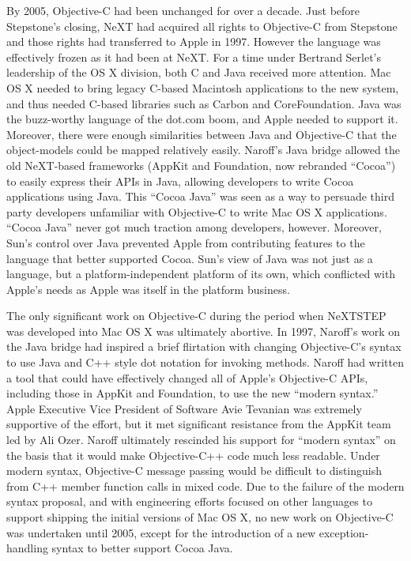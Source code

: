 \documentclass[acmsmall,screen]{acmart}
\begin{document}
By 2005, Objective-C had been unchanged for over a decade. Just before Stepstone's closing, NeXT had acquired all rights to Objective-C from Stepstone and those rights had transferred to Apple in 1997. However the language was effectively frozen as it had been at NeXT. For a time under Bertrand Serlet's leadership of the OS X division, both C and Java received more attention. Mac OS X needed to bring legacy C-based Macintosh applications to the new system, and thus needed C-based libraries such as Carbon and CoreFoundation. Java was the buzz-worthy language of the dot.com boom, and Apple needed to support it. Moreover, there were enough similarities between Java and Objective-C that the object-models could be mapped relatively easily. Naroff's Java bridge allowed the old NeXT-based frameworks (AppKit and Foundation, now rebranded ``Cocoa'') to easily express their APIs in Java, allowing developers to write Cocoa applications using Java. This ``Cocoa Java'' was seen as a way to persuade third party developers unfamiliar with Objective-C to write Mac OS X applications. ``Cocoa Java'' never got much traction among developers, however. Moreover, Sun's control over Java prevented Apple from contributing features to the language that better supported Cocoa. Sun's view of Java was not just as a language, but a platform-independent platform of its own, which conflicted with Apple's needs as Apple was itself in the platform business.

The only significant work on Objective-C during the period when NeXTSTEP was developed into Mac OS X was ultimately abortive. In 1997, Naroff's work on the Java bridge had inspired a brief flirtation with changing Objective-C's syntax to use Java and C++ style dot notation for invoking methods. Naroff had written a tool that could have effectively changed all of Apple's Objective-C APIs, including those in AppKit and Foundation, to use the new ``modern syntax.'' Apple Executive Vice President of Software Avie Tevanian was extremely supportive of the effort, but it met significant resistance from the AppKit team led by Ali Ozer. Naroff ultimately rescinded his support for ``modern syntax'' on the basis that it would make Objective-C++ code much less readable. Under modern syntax, Objective-C message passing would be difficult to distinguish from C++ member function calls in mixed code. Due to the failure of the modern syntax proposal, and with engineering efforts focused on other languages to support shipping the initial versions of Mac OS X, no new work on Objective-C was undertaken until 2005, except for the introduction of a new exception-handling syntax to better support Cocoa Java. 
\end{document}
